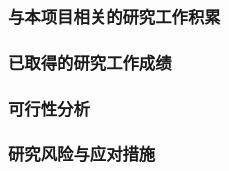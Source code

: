 \justifying
\NSFCBodyText

\subsubsection{与本项目相关的研究工作积累}

\subsubsection{已取得的研究工作成绩}

\subsubsection{可行性分析}

\subsubsection{研究风险与应对措施}
